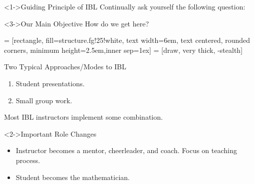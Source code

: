\documentclass[10pt]{beamer}
\begin{document}
\begin{frame}

\begin{block}<1->{Guiding Principle of IBL}
Continually ask yourself the following question:

\vspace{1em}


\end{block}

\begin{block}<3->{Our Main Objective}
How do we get here?

\begin{center}
 = [rectangle, fill=structure.fg!25!white, text width=6em, text centered, rounded corners, minimum height=2.5em,inner sep=1ex]
 = [draw, very thick, -stealth]
\end{center}
\end{block}

\end{frame}


\begin{frame}

\begin{block}{Two Typical Approaches/Modes to IBL}
\begin{enumerate}
\item Student presentations.
\item Small group work.
\end{enumerate}
Most IBL instructors implement some combination.
\end{block}

\begin{block}<2->{Important Role Changes}
\begin{itemize}
\item<2-> Instructor becomes a mentor, cheerleader, and coach. Focus on teaching process.
\item<2-> Student becomes the mathematician.
\end{itemize}
\end{block}

\end{frame}
\end{document}
